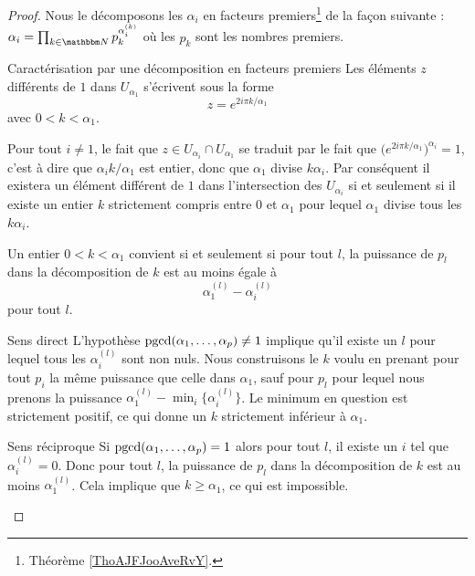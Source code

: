 \begin{proof}
    Nous le décomposons les \( \alpha_i\) en facteurs premiers\footnote{Théorème \ref{ThoAJFJooAveRvY}.} de la façon suivante : \( \alpha_i=\prod_{k\in \eN}p_k^{\alpha_i^{(k)}}\) où les \( p_k\) sont les nombres premiers. 
    
    \begin{subproof}
    \item[Caractérisation par une décomposition en facteurs premiers]
        Les éléments \( z\) différents de \( 1\) dans \( U_{\alpha_1}\) s'écrivent sous la forme
        \begin{equation}
            z= e^{2i\pi k/\alpha_1}
        \end{equation}
        avec \( 0<k<\alpha_1\).

        Pour tout \( i\neq 1\), le fait que \( z\in U_{\alpha_i}\cap U_{\alpha_1}\) se traduit par le fait que \( \big(  e^{2i\pi k/\alpha_1} \big)^{\alpha_i}=1\), c'est à dire que \( \alpha_ik/\alpha_1\) est entier, donc que \( \alpha_1\) divise \( k\alpha_i\). Par conséquent il existera un élément différent de \( 1\) dans l'intersection des \( U_{\alpha_i}\) si et seulement si il existe un entier \( k\) strictement compris entre \( 0\) et \( \alpha_1\) pour lequel \( \alpha_1\) divise tous les \( k\alpha_i\).

        Un entier \( 0<k<\alpha_1\) convient si et seulement si pour tout \( l\), la puissance de \( p_l\) dans la décomposition de \( k\) est au moins égale à
        \begin{equation}
            \alpha_1^{(l)}-\alpha_i^{(l)}
        \end{equation}
        pour tout \( l\).
    \item[Sens direct]
        L'hypothèse \( \operatorname{pgcd}(\alpha_1,\ldots, \alpha_p)\neq 1\) implique qu'il existe un \( l\) pour lequel tous les \( \alpha_i^{(l)}\) sont non nuls. Nous construisons le \( k\) voulu en prenant pour tout \( p_i\) la même puissance que celle dans \( \alpha_1\), sauf pour \( p_l\) pour lequel nous prenons la puissance \(  \alpha_1^{(l)}-\min_i\{   \alpha_i^{(l)} \} \). Le minimum en question est strictement positif, ce qui donne un \( k\) strictement inférieur à \( \alpha_1\).
    \item[Sens réciproque]
        Si \( \operatorname{pgcd}(\alpha_1,\ldots, \alpha_p)=1\) alors pour tout \( l\), il existe un \( i\) tel que \( \alpha_i^{(l)}=0\). Donc pour tout \( l\), la puissance de \( p_l\) dans la décomposition de \( k\) est au moins \( \alpha_1^{(l)}\). Cela implique que \( k\geq \alpha_1\), ce qui est impossible.
    \end{subproof}
\end{proof}

